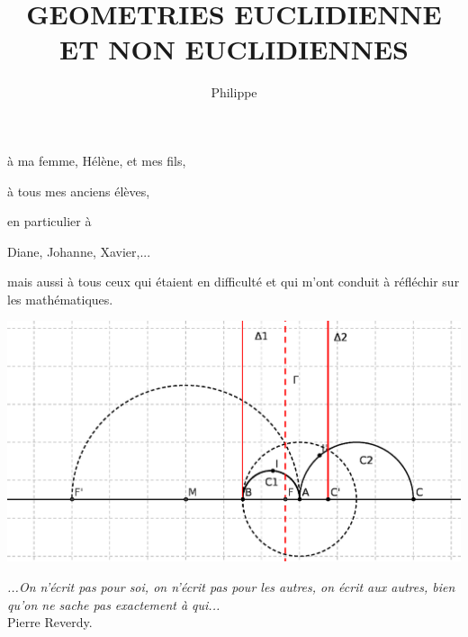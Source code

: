 \documentclass[a4paper, 12pt, twoside]{book}
\begin{document}
\title{GEOMETRIES EUCLIDIENNE ET NON EUCLIDIENNES}
\author{Philippe }
\date{} 

\maketitle

\begin{flushright}
\thispagestyle{empty}

à ma femme, Hélène, et mes fils,


à tous mes anciens élèves,

en particulier à 


 Diane, Johanne, Xavier,...
 
 mais aussi à tous ceux qui étaient en difficulté et qui m'ont conduit à réfléchir sur les mathématiques.

\end{flushright}







\includegraphics[scale=0.7]{figures/hyper37.eps}

\newpage 
{}
\begin{flushright}
\thispagestyle{empty}
\textit{...On n'écrit pas pour soi, on n'écrit pas pour les autres, on écrit aux autres, bien qu'on ne sache pas exactement à qui...}\\

Pierre Reverdy.

\end{flushright}
\end{document}
